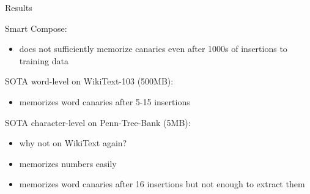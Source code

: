 \documentclass{beamer}
\begin{document}
\begin{frame}{Results}

Smart Compose:
\begin{itemize}
\item does not sufficiently memorize canaries even after 1000s of insertions to training data
\end{itemize}

\vfill

SOTA word-level on WikiText-103 (500MB):
\begin{itemize}
\item memorizes word canaries after  5-15 insertions
\end{itemize}

\vfill

SOTA character-level on Penn-Tree-Bank (5MB):
\begin{itemize}
\item why not on WikiText again?
\item memorizes numbers easily
\item memorizes word canaries after 16 insertions but not enough to extract them
\end{itemize}

\end{frame}
\end{document}
